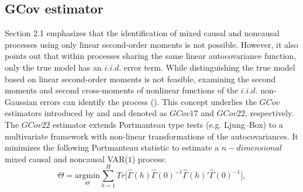 \documentclass[<1p>]{elsarticle} %
\begin{document}
\subsection{GCov estimator}
Section 2.1 emphasizes that the identification of mixed causal and noncausal processes using only linear second-order moments is not possible. However, it also points out that within processes sharing the same linear autocovariance function, only the true model has an $i.i.d.$ error term. While distinguishing the true model based on linear second-order moments is not feasible, examining the second moments and second cross-moments of nonlinear functions of the $i.i.d.$ non-Gaussian errors can identify the process (\cite{chan2006note}). This concept underlies the $GCov$ estimators introduced by \cite{gourieroux2017noncausal} and \cite{gourieroux2022generalized} and denoted as $GCov17$ and $GCov22$, respectively. The $GCov22$ estimator extends Portmanteau type tests (e.g. Ljung–Box) to a multivariate framework with non-linear transformations of the autocovariances. It minimizes the following Portmanteau statistic to estimate a $n-dimensional$ mixed causal and noncausal VAR($1$) process:
\begin{equation}
	\hat{\Theta}= \underset{\Theta}{\mathrm{argmin}} \sum_{h=1}^{H} Tr \bigl[ \hat{\Gamma}(h) \hat{\Gamma}(0)^{-1}\hat{\Gamma}(h)' \hat{\Gamma}(0)^{-1} \bigr],
\end{equation}
\end{document}
